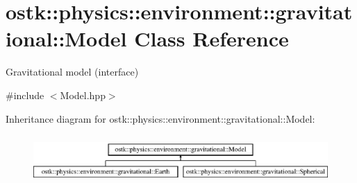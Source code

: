 \hypertarget{classostk_1_1physics_1_1environment_1_1gravitational_1_1_model}{}\section{ostk\+:\+:physics\+:\+:environment\+:\+:gravitational\+:\+:Model Class Reference}
\label{classostk_1_1physics_1_1environment_1_1gravitational_1_1_model}


Gravitational model (interface)  




{\ttfamily \#include $<$Model.\+hpp$>$}

Inheritance diagram for ostk\+:\+:physics\+:\+:environment\+:\+:gravitational\+:\+:Model\+:\begin{figure}[H]
\begin{center}
\leavevmode
\includegraphics[height=1.860465cm]{classostk_1_1physics_1_1environment_1_1gravitational_1_1_model}
\end{center}
\end{figure}
